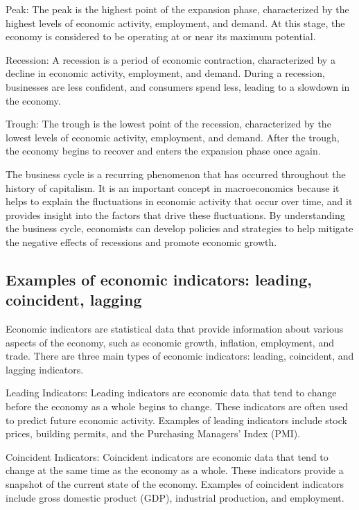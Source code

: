 \documentclass[12pt, a4paper, oneside]{article}
\begin{document}
Peak: The peak is the highest point of the expansion phase, characterized by the highest levels of economic activity, employment, and demand. At this stage, the economy is considered to be operating at or near its maximum potential.

Recession: A recession is a period of economic contraction, characterized by a decline in economic activity, employment, and demand. During a recession, businesses are less confident, and consumers spend less, leading to a slowdown in the economy.

Trough: The trough is the lowest point of the recession, characterized by the lowest levels of economic activity, employment, and demand. After the trough, the economy begins to recover and enters the expansion phase once again.

The business cycle is a recurring phenomenon that has occurred throughout the history of capitalism. It is an important concept in macroeconomics because it helps to explain the fluctuations in economic activity that occur over time, and it provides insight into the factors that drive these fluctuations. By understanding the business cycle, economists can develop policies and strategies to help mitigate the negative effects of recessions and promote economic growth.




\subsection{ Examples of economic indicators: leading, coincident, lagging }
Economic indicators are statistical data that provide information about various aspects of the economy, such as economic growth, inflation, employment, and trade. There are three main types of economic indicators: leading, coincident, and lagging indicators.

Leading Indicators: Leading indicators are economic data that tend to change before the economy as a whole begins to change. These indicators are often used to predict future economic activity. Examples of leading indicators include stock prices, building permits, and the Purchasing Managers' Index (PMI).

Coincident Indicators: Coincident indicators are economic data that tend to change at the same time as the economy as a whole. These indicators provide a snapshot of the current state of the economy. Examples of coincident indicators include gross domestic product (GDP), industrial production, and employment.
\end{document}
